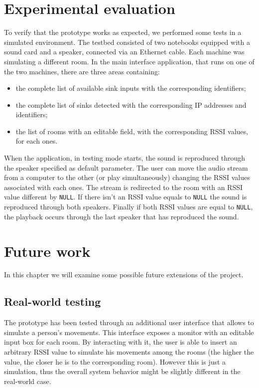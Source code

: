 \documentclass[conference]{IEEEtran}
\begin{document}
\section{Experimental evaluation}
To verify that the prototype works as expected, we performed some tests in a simulated environment. The testbed consisted of two notebooks equipped with a sound card and a speaker, connected via an Ethernet cable. Each machine was simulating a different room. In the main interface application, that runs on one of the two machines, there are three areas containing:
\begin{itemize}
	\item the complete list of available sink inputs with the corresponding identifiers;
	\item the complete list of sinks detected with the corresponding IP addresses and identifiers;
	\item the list of rooms with an editable field, with the corresponding RSSI values, for each ones.
\end{itemize}

When the application, in testing mode starts, the sound is reproduced through the speaker specified as default parameter. The user can move the audio stream from a computer to the other (or play simultaneously) changing the RSSI values associated with each ones. The stream is redirected to the room with an RSSI value different by \texttt{NULL}. If there isn't an RSSI value equals to \texttt{NULL} the sound is reproduced through both speakers. Finally if both RSSI values are equal to \texttt{NULL}, the playback occurs through the last speaker that has reproduced the sound.


\section{Future work}
In this chapter we will examine some possible future extensions of the project.

\subsection{Real-world testing}
The prototype has been tested through an additional user interface that allows to simulate a person's movements. This interface exposes a monitor with an editable input box for each room. By interacting with it, the user is able to insert an arbitrary RSSI value to simulate his movements among the rooms (the higher the value, the closer he is to the corresponding room). However this is just a simulation, thus the overall system behavior might be slightly different in the real-world case.
\end{document}
